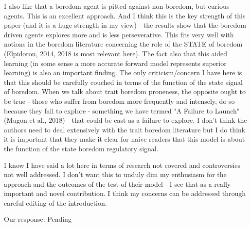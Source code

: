 \documentclass[utf8]{article}
\newenvironment{reply}  
    {\color{Blue}\noindent\newline}
    {\newline}
\begin{document}
        
        
        I also like that a boredom agent is pitted against non-boredom, but curious agents. This is an excellent approach. And I think this is the key strength of this paper (and it is a huge strength in my view) - the results show that the boredom driven agents explores more and is less perseverative. This fits very well with notions in the boredom literature concerning the role of the STATE of boredom (Elpidorou, 2014, 2018 is most relevant here). The fact also that this aided learning (in some sense a more accurate forward model represents superior learning) is also an important finding. The only criticism/concern I have here is that this should be carefully couched in terms of the function of the state signal of boredom. When we talk about trait boredom proneness, the opposite ought to be true - those who suffer from boredom more frequently and intensely, do so because they fail to explore - something we have termed "A Failure to Launch" (Mugon et al., 2018) - that could be cast as a failure to explore. I don't think the authors need to deal extensively with the trait boredom literature but I do think it is important that they make it clear for naive readers that this model is about the function of the state boredom regulatory signal.
        
        \begin{reply}
            \cite{mugon2018failure, Elpidorou.2018, Elpidorou2014}
        \end{reply}
        
        
        I know I have said a lot here in terms of research not covered and controversies not well addressed. I don't want this to unduly dim my enthusiasm for the approach and the outcomes of the test of their model - I see that as a really important and novel contribution. I think my concerns can be addressed through careful editing of the introduction.
        
        
        Our response:
        Pending


    
    	
\end{document}
